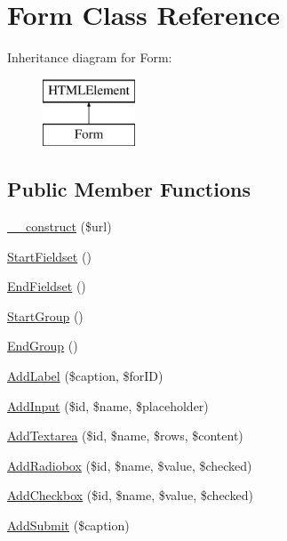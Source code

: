 \hypertarget{class_form}{\section{Form Class Reference}
\label{class_form}
}
Inheritance diagram for Form\-:\begin{figure}[H]
\begin{center}
\leavevmode
\includegraphics[height=2.000000cm]{class_form}
\end{center}
\end{figure}
\subsection*{Public Member Functions}
\begin{DoxyCompactItemize}
\item 
\hyperlink{class_form_af8e0b4973827723e65906c95202d1f21}{\-\_\-\-\_\-construct} (\$url)
\item 
\hyperlink{class_form_a7deb0d31f66b40e05275d35a0dd7df8a}{Start\-Fieldset} ()
\item 
\hyperlink{class_form_aeddc442ce366a4b306e7a2119e3dfa2a}{End\-Fieldset} ()
\item 
\hyperlink{class_form_abad660ab16e27fe886fa1ab94aa59fc6}{Start\-Group} ()
\item 
\hyperlink{class_form_a93d09060c95897b16ce80c1ff9d63c3f}{End\-Group} ()
\item 
\hyperlink{class_form_a04dcb3227fd89fd80faa6fa703ad0473}{Add\-Label} (\$caption, \$for\-I\-D)
\item 
\hyperlink{class_form_aea553a0a93d55c54a812f411c283cc3c}{Add\-Input} (\$id, \$name, \$placeholder)
\item 
\hyperlink{class_form_a5ea98b5e872229f51417bb35f24a1caf}{Add\-Textarea} (\$id, \$name, \$rows, \$content)
\item 
\hyperlink{class_form_ab01eeca79c10736be036f6f290c543f2}{Add\-Radiobox} (\$id, \$name, \$value, \$checked)
\item 
\hyperlink{class_form_a670614e87d32070235c9ac51252ccb04}{Add\-Checkbox} (\$id, \$name, \$value, \$checked)
\item 
\hyperlink{class_form_aa12881f537f967efd9a4665254dc0a8c}{Add\-Submit} (\$caption)
\end{DoxyCompactItemize}
